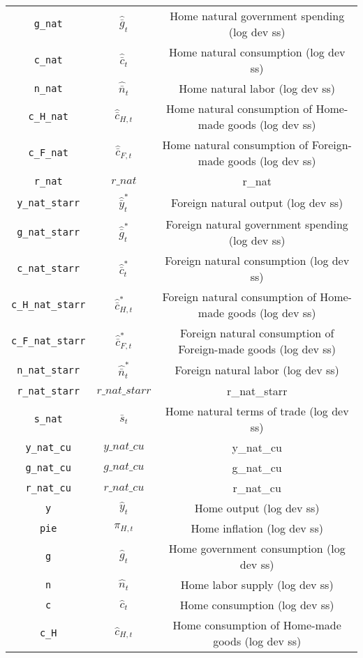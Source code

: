 \begin{center}
\begin{longtable}{ccc}
\texttt{g\_nat} & ${\hat {\bar g}_t}$ & Home natural government spending (log dev ss)\\
\texttt{c\_nat} & ${\hat {\bar c}_t}$ & Home natural consumption (log dev ss)\\
\texttt{n\_nat} & ${\hat {\bar n}_t}$ & Home natural labor (log dev ss)\\
\texttt{c\_H\_nat} & ${\hat {\bar c}_{H,t}}$ & Home natural consumption of Home-made goods (log dev ss)\\
\texttt{c\_F\_nat} & ${\hat {\bar c}_{F,t}}$ & Home natural consumption of Foreign-made goods (log dev ss)\\
\texttt{r\_nat} & $r\_nat$ & r\_nat\\
\texttt{y\_nat\_starr} & ${\hat {\bar y}_t^*}$ & Foreign natural output (log dev ss)\\
\texttt{g\_nat\_starr} & ${\hat {\bar g}_t^*}$ & Foreign natural government spending (log dev ss)\\
\texttt{c\_nat\_starr} & ${\hat {\bar c}_t^*}$ & Foreign natural consumption (log dev ss)\\
\texttt{c\_H\_nat\_starr} & ${\hat {\bar c}_{H,t}^*}$ & Foreign natural consumption of Home-made goods (log dev ss)\\
\texttt{c\_F\_nat\_starr} & ${\hat {\bar c}_{F,t}^*}$ & Foreign natural consumption of Foreign-made goods (log dev ss)\\
\texttt{n\_nat\_starr} & ${\hat {\bar n}_t^*}$ & Foreign natural labor (log dev ss)\\
\texttt{r\_nat\_starr} & $r\_nat\_starr$ & r\_nat\_starr\\
\texttt{s\_nat} & ${\bar s_t}$ & Home natural terms of trade (log dev ss)\\
\texttt{y\_nat\_cu} & $y\_nat\_cu$ & y\_nat\_cu\\
\texttt{g\_nat\_cu} & $g\_nat\_cu$ & g\_nat\_cu\\
\texttt{r\_nat\_cu} & $r\_nat\_cu$ & r\_nat\_cu\\
\texttt{y} & ${\hat y_t}$ & Home output (log dev ss)\\
\texttt{pie} & ${\pi_{H,t}}$ & Home inflation (log dev ss)\\
\texttt{g} & ${\hat g_t}$ & Home government consumption (log dev ss)\\
\texttt{n} & ${\hat n_t}$ & Home labor supply (log dev ss)\\
\texttt{c} & ${\hat c_t}$ & Home consumption (log dev ss)\\
\texttt{c\_H} & ${\hat c_{H,t}}$ & Home consumption of Home-made goods (log dev ss)\\

\end{longtable}
\end{center}
